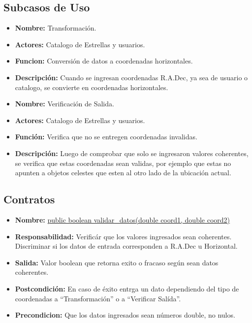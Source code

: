 \documentclass[letterpaper,spanish,10pt]{article}
\begin{document}
\subsection{Subcasos de Uso}

\begin{itemize}
\item \textbf{Nombre:} Transformaci\'on.
\item \textbf{Actores:} Catalogo de Estrellas y usuarios.
\item \textbf{Funcion:} Conversi\'on de datos a coordenadas horizontales.
\item \textbf{Descripci\'on:} Cuando se ingresan coordenadas R.A.Dec, ya sea de usuario o catalogo, se convierte en coordenadas horizontales.
\end{itemize}

\begin{itemize}
\item \textbf{Nombre:} Verificaci\'on de Salida.
\item \textbf{Actores:} Catalogo de Estrellas y usuarios.
\item \textbf{Funci\'on:} Verifica que no se entregen coordenadas invalidas.
\item \textbf{Descripci\'on:} Luego de comprobar que solo se ingresaron valores coherentes, se verifica que estas coordenadas sean validas, por ejemplo que estas no apunten a objetos celestes que esten al otro lado de la ubicaci\'on actual.
\end{itemize}


\subsection{Contratos}

\begin{itemize}
\item \textbf{Nombre:} \url{public boolean validar\_datos(double coord1, double coord2)}
\item \textbf{Responsabilidad:} Verific\'ar que los valores ingresados sean coherentes. Discriminar si los datos de entrada corresponden a R.A.Dec u Horizontal.
\item \textbf{Salida:} Valor boolean que retorna exito o fracaso seg\'un sean datos coherentes.
\item \textbf{Postcondici\'on:} En caso de \'exito entrga un dato dependiendo del tipo de coordenadas a ``Transformaci\'on'' o a ``Verificar Sal\'ida''.
\item \textbf{Precondicion:} Que los datos ingresados sean n\'umeros double, no nulos.
\end{itemize}
\end{document}
